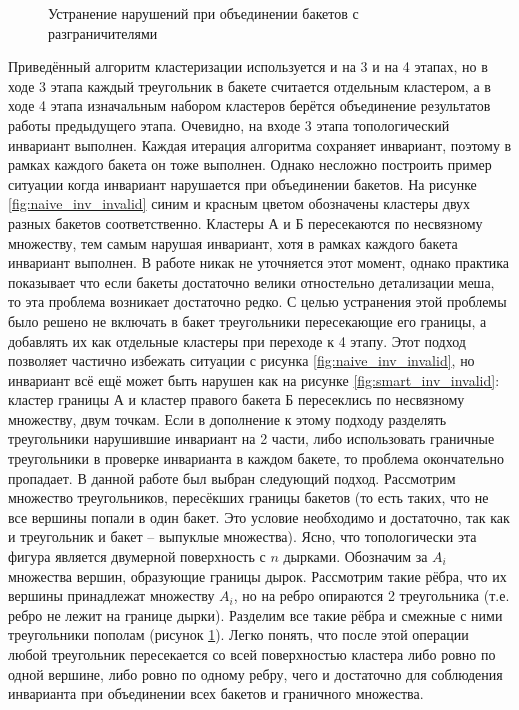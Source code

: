 \begin{figure}[ht]
  \caption{Устранение нарушений при объединении бакетов с разграничителями}
  \label{fig:inv_valid}
\endminipage\hfill
\end{figure}
Приведённый алгоритм кластеризации используется и на 3 и на 4 этапах, но в ходе 3 этапа каждый треугольник в бакете считается отдельным кластером, а в ходе 4 этапа изначальным набором кластеров берётся объединение результатов работы предыдущего этапа. Очевидно, на входе 3 этапа топологический инвариант выполнен. Каждая итерация алгоритма сохраняет инвариант, поэтому в рамках каждого бакета он тоже выполнен. Однако несложно построить пример ситуации когда инвариант нарушается при объединении бакетов. На рисунке  \ref{fig:naive_inv_invalid} синим и красным цветом обозначены кластеры двух разных бакетов соответственно. Кластеры А и Б пересекаются по несвязному множеству, тем самым нарушая инвариант, хотя в рамках каждого бакета инвариант выполнен. В работе \cite{niski2007multi} никак не уточняется этот момент, однако практика показывает что если бакеты достаточно велики отностельно детализации меша, то эта проблема возникает достаточно редко. С целью устранения этой проблемы было решено не включать в бакет треугольники пересекающие его границы, а добавлять их как отдельные кластеры при переходе к 4 этапу. Этот подход позволяет частично избежать ситуации с рисунка \ref{fig:naive_inv_invalid}, но инвариант всё ещё может быть нарушен как на рисунке \ref{fig:smart_inv_invalid}: кластер границы А и кластер правого бакета Б пересеклись по несвязному множеству, двум точкам. Если в дополнение к этому подходу разделять треугольники нарушившие инвариант на 2 части, либо использовать граничные треугольники в проверке инварианта в каждом бакете, то проблема окончательно пропадает. В данной работе был выбран следующий подход. Рассмотрим множество треугольников, пересёкших границы бакетов (то есть таких, что не все вершины попали в один бакет. Это условие необходимо и достаточно, так как и треугольник и бакет -- выпуклые множества). Ясно, что топологически эта фигура является двумерной поверхность с $n$ дырками. Обозначим за $A_i$ множества вершин, образующие границы дырок. Рассмотрим такие рёбра, что их вершины принадлежат множеству $A_i$, но на ребро опираются 2 треугольника (т.е. ребро не лежит на границе дырки). Разделим все такие рёбра и смежные с ними треугольники пополам (рисунок \ref{fig:inv_valid}). Легко понять, что после этой операции любой треугольник пересекается со всей поверхностью кластера либо ровно по одной вершине, либо ровно по одному ребру, чего и достаточно для соблюдения инварианта при объединении всех бакетов и граничного множества.

